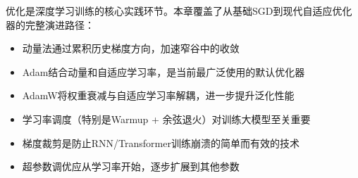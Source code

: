 优化是深度学习训练的核心实践环节。本章覆盖了从基础SGD到现代自适应优化器的完整演进路径：
\begin{itemize}
    \item 动量法通过累积历史梯度方向，加速窄谷中的收敛
    \item Adam结合动量和自适应学习率，是当前最广泛使用的默认优化器
    \item AdamW将权重衰减与自适应学习率解耦，进一步提升泛化性能
    \item 学习率调度（特别是Warmup + 余弦退火）对训练大模型至关重要
    \item 梯度裁剪是防止RNN/Transformer训练崩溃的简单而有效的技术
    \item 超参数调优应从学习率开始，逐步扩展到其他参数
\end{itemize}
